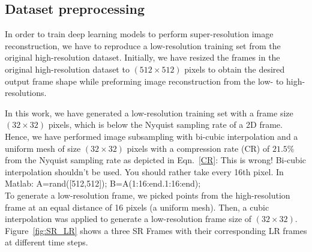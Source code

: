 \subsection{Dataset preprocessing}
In order to train deep learning models to perform super-resolution image reconstruction, we have to reproduce a low-resolution training set from the original high-resolution dataset. 
Initially, we have resized the frames in the original high-resolution dataset to \((512\times512)\) pixels to obtain the desired output frame shape while preforming image reconstruction from the low- to high-resolutions.

In this work, we have generated a low-resolution training set with a frame size \((32\times32)\) pixels, which is below the Nyquist sampling rate of a 2D frame.
Hence, we have performed image subsampling with bi-cubic interpolation and a uniform mesh of size \((32\times32)\) pixels with a compression rate (CR) of \(21.5\%\) from the Nyquist sampling rate as depicted in Eqn.~\ref{CR}:
{\color{RubineRed} 
This is wrong! Bi-cubic interpolation shouldn't be used. You should rather take every 16th pixel.
In Matlab:
A=rand([512,512]);
B=A(1:16:end.1:16:end);	
\\

To generate a low-resolution frame, we picked points from the high-resolution frame at an equal distance of 16 pixels (a uniform mesh).
Then, a cubic interpolation was applied to generate a low-resolution frame size of \((32\times32)\). \\

}
Figure~\ref{fig:SR_LR} shows a three SR Frames with their corresponding LR frames at different time steps.

